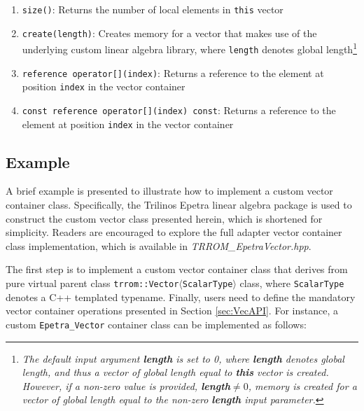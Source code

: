 \begin{enumerate}
    \item \texttt{size()}: Returns the number of local elements in \texttt{this} vector
    \item \texttt{create(length)}: Creates memory for a vector that makes use of the underlying custom linear algebra library, where \texttt{length} denotes global length\footnote{\emph{The default input argument \textbf{length} is set to 0, where \textbf{length} denotes global length, and thus a vector of global length equal to \textbf{this} vector is created. However, if a non-zero value is provided, \textbf{length}$\neq0$, memory is created for a vector of global length equal to the non-zero \textbf{length} input parameter.}}
    \item \texttt{reference operator[](index)}: Returns a reference to the element at position \texttt{index} in the vector container
    \item \texttt{const reference operator[](index) const}: Returns a reference to the element at position \texttt{index} in the vector container
    \end{enumerate}
    
    \subsection{Example}\label{subsec:VecEx}
    
    A brief example is presented to illustrate how to implement a custom vector container class. Specifically, the Trilinos Epetra linear algebra package is used to construct the custom vector class presented herein, which is shortened for simplicity. Readers are encouraged to explore the full adapter vector container class implementation, which is available in \emph{TRROM\_EpetraVector.hpp}. 
    
    The first step is to implement a custom vector container class that derives from pure virtual parent class \texttt{trrom::Vector$\mathbf{\langle}$ScalarType$\mathbf{\rangle}$} class, where \texttt{ScalarType} denotes a C++ templated typename. Finally, users need to define the mandatory vector container operations presented in Section \ref{sec:VecAPI}. For instance, a custom \texttt{Epetra\_Vector} container class can be implemented as follows:
    
